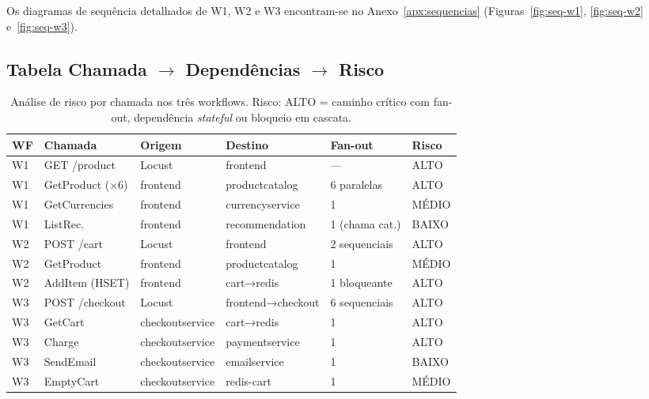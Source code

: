 \documentclass[manuscript,screen,review]{acmart}
\begin{document}
Os diagramas de sequência detalhados de W1, W2 e W3 encontram-se no Anexo~\ref{apx:sequencias} (Figuras~\ref{fig:seq-w1}, \ref{fig:seq-w2} e~\ref{fig:seq-w3}).

\subsection{Tabela Chamada $\rightarrow$ Dependências $\rightarrow$ Risco}

\begin{table}[t]
\caption{Análise de risco por chamada nos três workflows. Risco: ALTO = caminho crítico com fan-out, dependência \textit{stateful} ou bloqueio em cascata.}
\label{tab:risco}
\begin{tabular}{llllll}
\toprule
\textbf{WF} & \textbf{Chamada} & \textbf{Origem} & \textbf{Destino} & \textbf{Fan-out} & \textbf{Risco} \\
\midrule
W1 & GET /product     & Locust          & frontend          & —                & ALTO \\
W1 & GetProduct (×6)  & frontend        & productcatalog    & 6 paralelas      & ALTO \\
W1 & GetCurrencies    & frontend        & currencyservice   & 1                & MÉDIO \\
W1 & ListRec.         & frontend        & recommendation    & 1 (chama cat.)   & BAIXO \\
W2 & POST /cart       & Locust          & frontend          & 2 sequenciais    & ALTO \\
W2 & GetProduct       & frontend        & productcatalog    & 1                & MÉDIO \\
W2 & AddItem (HSET)   & frontend        & cart→redis        & 1 bloqueante     & ALTO \\
W3 & POST /checkout   & Locust          & frontend→checkout & 6 sequenciais    & ALTO \\
W3 & GetCart          & checkoutservice & cart→redis        & 1                & ALTO \\
W3 & Charge           & checkoutservice & paymentservice    & 1                & ALTO \\
W3 & SendEmail        & checkoutservice & emailservice      & 1                & BAIXO \\
W3 & EmptyCart        & checkoutservice & redis-cart        & 1                & MÉDIO \\
\bottomrule
\end{tabular}
\end{table}
\end{document}
